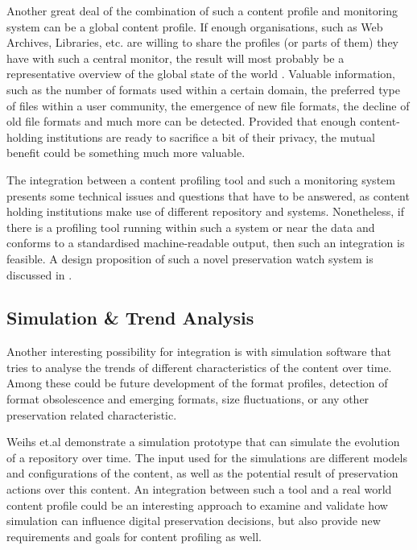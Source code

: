 Another great deal of the combination of such a content profile and monitoring system can be a global content profile. If enough organisations, such as Web Archives, Libraries, etc. are willing to share the profiles (or parts of them) they have with such a central monitor, the result will most probably be a representative overview of the global state of the world \cite{becker-ipres2012}. Valuable information, such as the number of formats used within a certain domain, the preferred type of files within a user community, the emergence of new file formats, the decline of old file formats and much more can be detected. Provided that enough content-holding institutions are ready to sacrifice a bit of their privacy, the mutual benefit could be something much more valuable.

The integration between a content profiling tool and such a monitoring system presents some technical issues and questions that have to be answered, as content holding institutions make use of different repository and systems. Nonetheless, if there is a profiling tool running within such a system or near the data and conforms to a standardised machine-readable output, then such an integration is feasible. A design proposition of such a novel preservation watch system is discussed in \cite{duretec:2012:watch, FariaPDBFR12}.



\subsection{Simulation \& Trend Analysis}
Another interesting possibility for integration is with simulation software that tries to analyse the trends of different characteristics of the content over time. Among these could be future development of the format profiles, detection of format obsolescence and emerging formats, size fluctuations, or any other preservation related characteristic.

Weihs et.al demonstrate a simulation prototype \cite{TUW-206758} that can simulate the evolution of a repository over time. The input used for the simulations are different models and configurations of the content, as well as the potential result of preservation actions over this content. An integration between such a tool and a real world content profile could be an interesting approach to examine and validate how simulation can influence digital preservation decisions, but also provide new requirements and goals for content profiling  as well.

